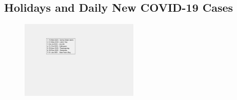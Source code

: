\documentclass[]{article}
\begin{document}
\subsection{Holidays and Daily New COVID-19 Cases}

\begin{figure}[!h]
	\centering
	\includegraphics[width=0.50\textwidth]{legends/holiday_legend.png}
	\caption{}
	\label{fig:legends/holiday_legendLabel}
\end{figure}
\end{document}

